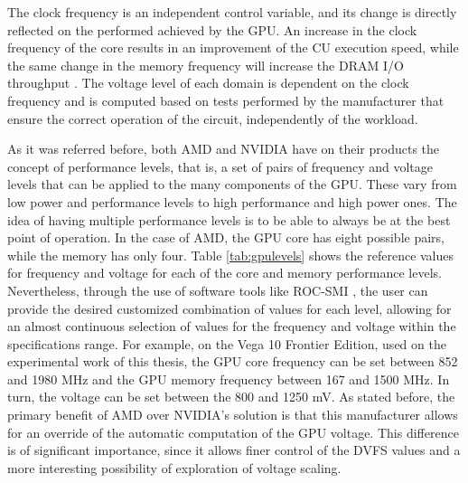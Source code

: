 The clock frequency is an independent control variable, and its change is directly reflected on the performed achieved by the GPU. An increase in the clock frequency of the core results in an improvement of the CU execution speed, while the same change in the memory frequency will increase the DRAM I/O throughput \cite{mei_survey_2016}. The voltage level of each domain is dependent on the clock frequency and is computed based on tests performed by the manufacturer that ensure the correct operation of the circuit, independently of the workload.

As it was referred before, both AMD and NVIDIA have on their products the concept of performance levels, that is, a set of pairs of frequency and voltage levels that can be applied to the many components of the GPU. These vary from low power and performance levels to high performance and high power ones. The idea of having multiple performance levels is to be able to always be at the best point of operation.  In the case of AMD, the GPU core has eight possible pairs, while the memory has only four. Table \ref{tab:gpulevels} shows the reference values for frequency and voltage for each of the core and memory performance levels. Nevertheless, through the use of software tools like ROC-SMI \cite{noauthor_radeonopencompute/roc-smi_2019}, the user can provide the desired customized combination of values for each level, allowing for an almost continuous selection of values for the frequency and voltage within the specifications range. For example, on the Vega 10 Frontier Edition, used on the experimental work of this thesis, the GPU core frequency can be set between 852 and 1980 MHz and the GPU memory frequency between 167 and 1500 MHz. In turn, the voltage can be set between the 800 and 1250 mV. As stated before, the primary benefit of AMD over NVIDIA's solution is that this manufacturer allows for an override of the automatic computation of the GPU voltage. This difference is of significant importance, since it allows finer control of the DVFS values and a more interesting possibility of exploration of voltage scaling.


